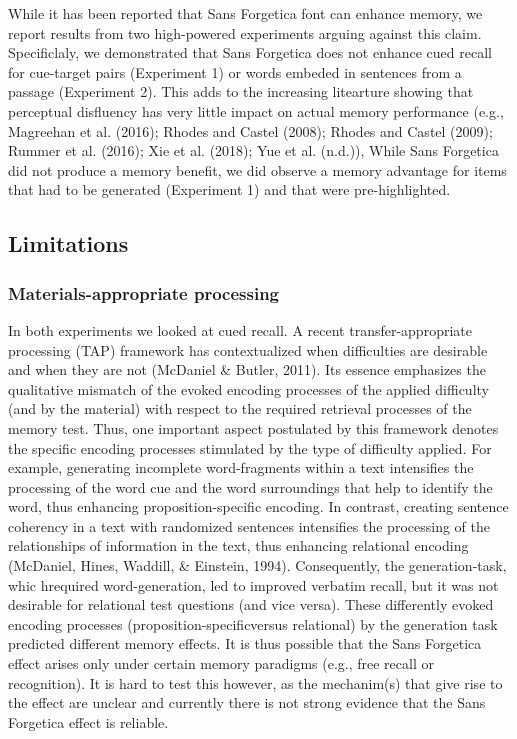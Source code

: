 \documentclass[english,doc]{apa6}
\begin{document}
While it has been reported that Sans Forgetica font can enhance memory, we report results from two high-powered experiments arguing against this claim. Specificlaly, we demonstrated that Sans Forgetica does not enhance cued recall for cue-target pairs (Experiment 1) or words embeded in sentences from a passage (Experiment 2). This adds to the increasing litearture showing that perceptual disfluency has very little impact on actual memory performance (e.g., Magreehan et al. (2016); Rhodes and Castel (2008); Rhodes and Castel (2009); Rummer et al. (2016); Xie et al. (2018); Yue et al. (n.d.)), While Sans Forgetica did not produce a memory benefit, we did observe a memory advantage for items that had to be generated (Experiment 1) and that were pre-highlighted.

\hypertarget{limitations}{%
\subsection{Limitations}\label{limitations}}

\hypertarget{materials-appropriate-processing}{%
\subsubsection{Materials-appropriate processing}\label{materials-appropriate-processing}}

In both experiments we looked at cued recall. A recent transfer-appropriate processing (TAP) framework has contextualized when difficulties are desirable and when they are not (McDaniel \& Butler, 2011). Its essence emphasizes the qualitative mismatch of the evoked encoding processes of the applied difficulty (and by the material) with respect to the required retrieval processes of the memory test. Thus, one important aspect postulated by this framework denotes the specific encoding processes stimulated by the type of difficulty applied. For example, generating incomplete word-fragments within a text intensifies the processing of the word cue and the word surroundings that help to identify the word, thus enhancing proposition-specific encoding. In contrast, creating sentence coherency in a text with randomized sentences intensifies the processing of the relationships of information in the text, thus enhancing relational encoding (McDaniel, Hines, Waddill, \& Einstein, 1994). Consequently, the generation-task, whic hrequired word-generation, led to improved verbatim recall, but it was not desirable for relational test questions (and vice versa). These differently evoked encoding processes (proposition-specificversus relational) by the generation task predicted different memory effects. It is thus possible that the Sans Forgetica effect arises only under certain memory paradigms (e.g., free recall or recognition). It is hard to test this however, as the mechanim(s) that give rise to the effect are unclear and currently there is not strong evidence that the Sans Forgetica effect is reliable.
\end{document}
